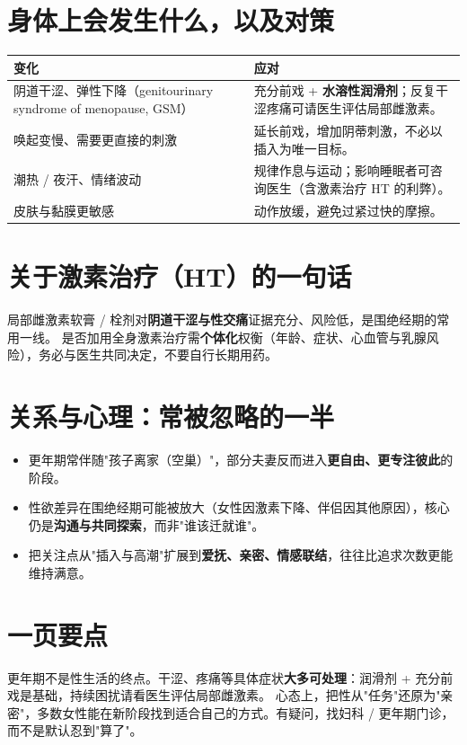 \section{身体上会发生什么，以及对策}
\begin{tabularx}{\textwidth}{l X}
\toprule
\textbf{变化} & \textbf{应对} \\
\midrule
阴道干涩、弹性下降（genitourinary syndrome of menopause, GSM） & 充分前戏 + \textbf{水溶性润滑剂}；反复干涩疼痛可请医生评估局部雌激素。 \\
唤起变慢、需要更直接的刺激 & 延长前戏，增加阴蒂刺激，不必以插入为唯一目标。 \\
潮热 / 夜汗、情绪波动 & 规律作息与运动；影响睡眠者可咨询医生（含激素治疗 HT 的利弊）。 \\
皮肤与黏膜更敏感 & 动作放缓，避免过紧过快的摩擦。 \\
\bottomrule
\end{tabularx}

\section{关于激素治疗（HT）的一句话}
局部雌激素软膏 / 栓剂对\textbf{阴道干涩与性交痛}证据充分、风险低，是围绝经期的常用一线。
是否加用全身激素治疗需\textbf{个体化}权衡（年龄、症状、心血管与乳腺风险），务必与医生共同决定，不要自行长期用药。

\section{关系与心理：常被忽略的一半}
\begin{itemize}
  \item 更年期常伴随"孩子离家（空巢）"，部分夫妻反而进入\textbf{更自由、更专注彼此}的阶段。
  \item 性欲差异在围绝经期可能被放大（女性因激素下降、伴侣因其他原因），核心仍是\textbf{沟通与共同探索}，而非"谁该迁就谁"。
  \item 把关注点从"插入与高潮"扩展到\textbf{爱抚、亲密、情感联结}，往往比追求次数更能维持满意。
\end{itemize}

\section{一页要点}
更年期不是性生活的终点。干涩、疼痛等具体症状\textbf{大多可处理}：润滑剂 + 充分前戏是基础，持续困扰请看医生评估局部雌激素。
心态上，把性从"任务"还原为"亲密"，多数女性能在新阶段找到适合自己的方式。有疑问，找妇科 / 更年期门诊，而不是默认忍到"算了"。


